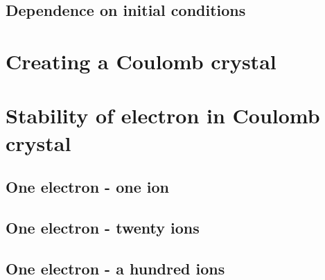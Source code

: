 \subsection{Dependence on initial conditions}

\section{Creating a Coulomb crystal}

\section{Stability of electron in Coulomb crystal}
\subsection{One electron - one ion}
\subsection{One electron - twenty ions}
\subsection{One electron - a hundred ions}